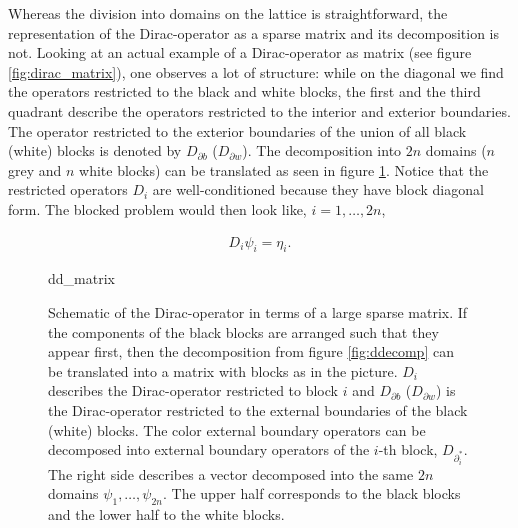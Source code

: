 \documentclass{article}
\theoremstyle{plain} %
\theoremstyle{convention} %
\theoremstyle{remark} %
\numberwithin{equation}{section}
\begin{document}
Whereas the division into domains on the lattice is straightforward, the representation of the Dirac-operator as a sparse matrix and its decomposition is not. Looking at an actual example of a Dirac-operator as matrix (see figure \ref{fig:dirac_matrix}), one observes a lot of structure: while on the diagonal we find the operators restricted to the black and white blocks, the first and the third quadrant describe the operators restricted to the interior and exterior boundaries. The operator restricted to the exterior boundaries of the union of all black (white) blocks is denoted by $D_{\partial b}$ ($D_{\partial w}$). The decomposition into $2n$ domains ($n$ grey and $n$ white blocks) can be translated as seen in figure \ref{fig:ddecomp_matrix}. Notice that the restricted operators $D_i$ are well-conditioned because they have block diagonal form. The blocked problem would then look like, $i = 1, \dots, 2n$,

\begin{align*}
    D_i \psi_i = \eta_i.
\end{align*}

\begin{figure}[h]
  \centering
  {dd_matrix}
  \caption{Schematic of the Dirac-operator in terms of a large sparse matrix. If the components of the black blocks are arranged such that they appear first, then the decomposition from figure \ref{fig:ddecomp} can be translated into a matrix with blocks as in the picture. $D_i$ describes the Dirac-operator restricted to block $i$ and $D_{\partial b}$ ($D_{\partial w}$) is the Dirac-operator restricted to the external boundaries of the black (white) blocks. The color external boundary operators can be decomposed into external boundary operators of the $i$-th block, $D_{\partial^{*}_i}$. The right side describes a vector decomposed into the same $2n$ domains $\psi_1, \dots, \psi_{2n}$. The upper half corresponds to the black blocks and the lower half to the white blocks.}
  \label{fig:ddecomp_matrix}
\end{figure}

\end{document}
